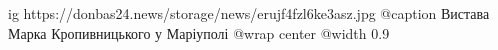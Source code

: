  
 
 
 
 

\ifcmt
  ig https://donbas24.news/storage/news/erujf4fzl6ke3asz.jpg
	@caption Вистава Марка Кропивницького у Маріуполі
  @wrap center
  @width 0.9
\fi
